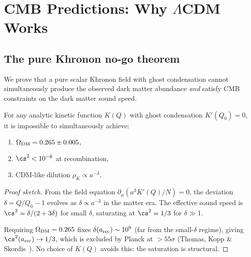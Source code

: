 %
%
%


\section{CMB Predictions: Why \texorpdfstring{$\Lambda$CDM}{LCDM} Works}
\label{sec:cmb}

\subsection{The pure Khronon no-go theorem}
\label{sec:nogo}

We prove that a pure scalar Khronon field with ghost condensation
cannot simultaneously produce the observed dark matter abundance
\emph{and} satisfy CMB constraints on the dark matter sound speed.

\begin{theorem}
\label{thm:nogo}
For any analytic kinetic function $K(Q)$ with ghost condensation
$K'(Q_0) = 0$, it is impossible to simultaneously achieve:
\begin{enumerate}
\item[(i)] $\Omega_{\rm DM} = 0.265 \pm 0.005$,
\item[(ii)] $\cs^2 < 10^{-6}$ at recombination,
\item[(iii)] CDM-like dilution $\rho_K \propto a^{-3}$.
\end{enumerate}
\end{theorem}

\begin{proof}[Proof sketch]
From the field equation $\partial_\mu(a^3 K'(Q)/N) = 0$, the deviation
$\delta = Q/Q_0 - 1$ evolves as $\delta \propto a^{-3}$ in the
matter era.  The effective sound speed is $\cs^2 = \delta/(2+3\delta)$
for small $\delta$, saturating at $\cs^2 = 1/3$ for $\delta \gg 1$.

Requiring $\Omega_{\rm DM} = 0.265$ fixes $\delta(a_{\rm rec})
\sim 10^9$ (far from the small-$\delta$ regime), giving
$\cs^2(a_{\rm rec}) \to 1/3$, which is excluded by Planck at
$> 55\sigma$ (Thomas, Kopp \& Skordis~\cite{TKS2016}).
No choice of $K(Q)$ avoids this: the saturation is structural.
\end{proof}


